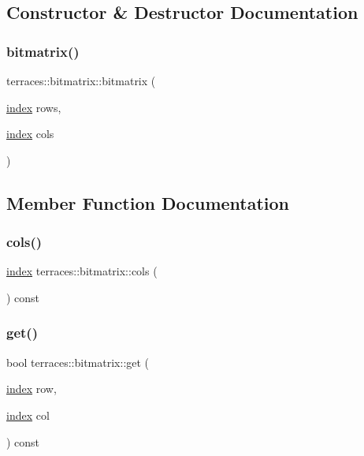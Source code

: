 \subsection{Constructor \& Destructor Documentation}
\mbox{\label{classterraces_1_1bitmatrix_ab3210e10f4ffb9850325e93db17b9e0d}} 
\subsubsection{\texorpdfstring{bitmatrix()}{bitmatrix()}}
{\footnotesize\ttfamily terraces\+::bitmatrix\+::bitmatrix (\begin{DoxyParamCaption}\item[{\hyperlink{namespaceterraces_adbc33ccb543d1634e96d0eb02e472c77}{index}}]{rows,  }\item[{\hyperlink{namespaceterraces_adbc33ccb543d1634e96d0eb02e472c77}{index}}]{cols }\end{DoxyParamCaption})}



\subsection{Member Function Documentation}
\mbox{\label{classterraces_1_1bitmatrix_a55c1ef8f0554b8b82c2f4f86e8d4a0ef}} 
\subsubsection{\texorpdfstring{cols()}{cols()}}
{\footnotesize\ttfamily \hyperlink{namespaceterraces_adbc33ccb543d1634e96d0eb02e472c77}{index} terraces\+::bitmatrix\+::cols (\begin{DoxyParamCaption}{ }\end{DoxyParamCaption}) const}

\mbox{\label{classterraces_1_1bitmatrix_aef01e1c2bc601f43786343adf8b3876e}} 
\subsubsection{\texorpdfstring{get()}{get()}}
{\footnotesize\ttfamily bool terraces\+::bitmatrix\+::get (\begin{DoxyParamCaption}\item[{\hyperlink{namespaceterraces_adbc33ccb543d1634e96d0eb02e472c77}{index}}]{row,  }\item[{\hyperlink{namespaceterraces_adbc33ccb543d1634e96d0eb02e472c77}{index}}]{col }\end{DoxyParamCaption}) const}

